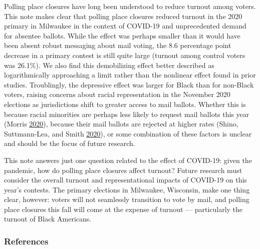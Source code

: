 \documentclass[
  12pt,
]{article}
\begin{document}
Polling place closures have long been understood to reduce turnout among voters. This note makes clear that polling place closures reduced turnout in the 2020 primary in Milwaukee in the context of COVID-19 and unprecedented demand for absentee ballots. While the effect was perhaps smaller than it would have been absent robust messaging about mail voting, the 8.6 percentage point decrease in a primary contest is still quite large (turnout among control voters was 26.1\%). We also find this demobilizing effect better described as logarithmically approaching a limit rather than the nonlinear effect found in prior studies. Troublingly, the depressive effect was larger for Black than for non-Black voters, raising concerns about racial representation in the November 2020 elections as jurisdictions shift to greater access to mail ballots. Whether this is because racial minorities are perhaps less likely to request mail ballots this year (Morris \protect\hyperlink{ref-Morris2020}{2020}), because their mail ballots are rejected at higher rates (Shino, Suttmann-Lea, and Smith \protect\hyperlink{ref-Shino2020}{2020}), or some combination of these factors is unclear and should be the focus of future research.

This note answers just one question related to the effect of COVID-19: given the pandemic, how do polling place closures affect turnout? Future research must consider the overall turnout and representational impacts of COVID-19 on this year's contests. The primary elections in Milwaukee, Wisconsin, make one thing clear, however: voters will not seamlessly transition to vote by mail, and polling place closures this fall will come at the expense of turnout --- particularly the turnout of Black Americans.

\newpage

\hypertarget{references}{%
\subsubsection*{References}\label{references}}
\end{document}
